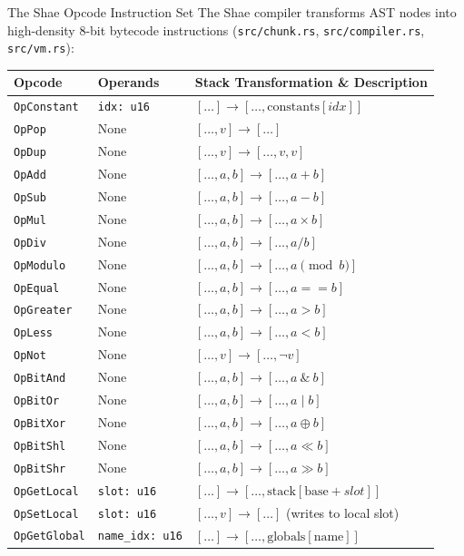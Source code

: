 \begin{deepbox}{The Shae Opcode Instruction Set}
The Shae compiler transforms AST nodes into high-density 8-bit bytecode instructions (\texttt{src/chunk.rs}, \texttt{src/compiler.rs}, \texttt{src/vm.rs}):

\begin{longtable}{lll}
\toprule
\textbf{Opcode} & \textbf{Operands} & \textbf{Stack Transformation \& Description} \\
\midrule
\endhead
\texttt{OpConstant} & \texttt{idx: u16} & $[\dots] \to [\dots, \text{constants}[idx]]$ \\
\texttt{OpPop} & None & $[\dots, v] \to [\dots]$ \\
\texttt{OpDup} & None & $[\dots, v] \to [\dots, v, v]$ \\
\texttt{OpAdd} & None & $[\dots, a, b] \to [\dots, a + b]$ \\
\texttt{OpSub} & None & $[\dots, a, b] \to [\dots, a - b]$ \\
\texttt{OpMul} & None & $[\dots, a, b] \to [\dots, a \times b]$ \\
\texttt{OpDiv} & None & $[\dots, a, b] \to [\dots, a / b]$ \\
\texttt{OpModulo} & None & $[\dots, a, b] \to [\dots, a \pmod b]$ \\
\texttt{OpEqual} & None & $[\dots, a, b] \to [\dots, a == b]$ \\
\texttt{OpGreater} & None & $[\dots, a, b] \to [\dots, a > b]$ \\
\texttt{OpLess} & None & $[\dots, a, b] \to [\dots, a < b]$ \\
\texttt{OpNot} & None & $[\dots, v] \to [\dots, \neg v]$ \\
\texttt{OpBitAnd} & None & $[\dots, a, b] \to [\dots, a \ \& \ b]$ \\
\texttt{OpBitOr} & None & $[\dots, a, b] \to [\dots, a \mid b]$ \\
\texttt{OpBitXor} & None & $[\dots, a, b] \to [\dots, a \oplus b]$ \\
\texttt{OpBitShl} & None & $[\dots, a, b] \to [\dots, a \ll b]$ \\
\texttt{OpBitShr} & None & $[\dots, a, b] \to [\dots, a \gg b]$ \\
\texttt{OpGetLocal} & \texttt{slot: u16} & $[\dots] \to [\dots, \text{stack}[\text{base} + slot]]$ \\
\texttt{OpSetLocal} & \texttt{slot: u16} & $[\dots, v] \to [\dots]$ (writes to local slot) \\
\texttt{OpGetGlobal} & \texttt{name\_idx: u16} & $[\dots] \to [\dots, \text{globals}[\text{name}]]$ \\

\end{longtable}
\end{deepbox}
